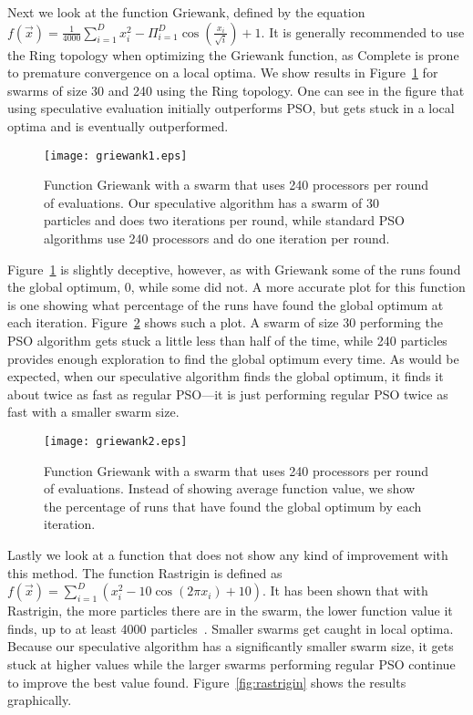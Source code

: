 \documentclass[journal,letterpaper]{IEEEtran}
\newcommand{\fig}[1]{Figure~\ref{fig:#1}}
\begin{document}
Next we look at the function Griewank, defined by the equation $f(\Vec{x}) =
\frac{1}{4000} \sum_{i=1}^D x_i^2 - \Pi_{i=1}^D \cos\left(\frac{x_i}{\sqrt{i}}
\right) + 1$.  It is generally recommended to use the Ring topology when
optimizing the Griewank function, as Complete is prone to premature convergence
on a local optima.  We show results in \fig{basic-griewank1} for swarms of size
30 and 240 using the Ring topology. One can see in the figure that using
speculative evaluation initially outperforms PSO, but gets stuck in a local
optima and is eventually outperformed.  

\begin{figure}
  \centering
  \texttt{[image: griewank1.eps]}
  \caption{Function Griewank with a swarm that uses 240 processors per round of
  evaluations.  Our speculative algorithm has a swarm of 30 particles and does
  two iterations per round, while standard PSO algorithms use 240 processors
  and do one iteration per round.}
  \label{fig:basic-griewank1}
\end{figure}

\fig{basic-griewank1} is slightly deceptive, however, as with Griewank some of
the runs found the global optimum, 0, while some did not.  A more accurate plot
for this function is one showing what percentage of the runs have found the
global optimum at each iteration.  \fig{basic-griewank2} shows such a plot.  A
swarm of size 30 performing the PSO algorithm gets stuck a little less than
half of the time, while 240 particles provides enough exploration to find the
global optimum every time.  As would be expected, when our speculative
algorithm finds the global optimum, it finds it about twice as fast as regular
PSO---it is just performing regular PSO twice as fast with a smaller swarm
size.

\begin{figure}
  \centering
  \texttt{[image: griewank2.eps]}
  \caption{Function Griewank with a swarm that uses 240 processors per round of
  evaluations.  Instead of showing average function value, we show the
  percentage of runs that have found the global optimum by each iteration.}
  \label{fig:basic-griewank2}
\end{figure}

Lastly we look at a function that does not show any kind of improvement with
this method.  The function Rastrigin is defined as $f(\Vec{x}) = \sum_{i=1}^D
\left(x_i^2 - 10\cos\left(2\pi x_i\right) + 10\right)$.  It has been shown that
with Rastrigin, the more particles there are in the swarm, the lower function
value it finds, up to at least 4000 particles~\cite{mcnabb-cec09}.  Smaller
swarms get caught in local optima.  Because our speculative algorithm has a
significantly smaller swarm size, it gets stuck at higher values while the
larger swarms performing regular PSO continue to improve the best value found.
\fig{rastrigin} shows the results graphically.
\end{document}
